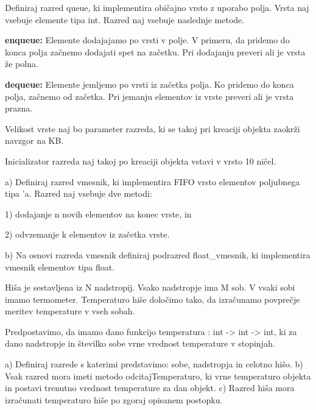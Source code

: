 \begin{ex}
  Definiraj razred queue, ki implementira obi\v cajno vrsto z uporabo
  polja. Vrsta naj vsebuje elemente tipa int. Razred naj vsebuje
  naslednje metode.

  \textbf{enqueue:} Elemente dodajajamo po vrsti v polje. V primeru,
  da pridemo do konca polja za\v cnemo dodajati spet na za\v
  cetku. Pri dodajanju preveri ali je vrsta \v ze polna.
                 
  \textbf{dequeue:} Elemente jemljemo po vrsti iz za\v cetka polja. Ko
  pridemo do konca polja, za\v cnemo od za\v cetka. Pri jemanju
  elementov iz vrste preveri ali je vrsta prazna.

  Velikost vrste naj bo parameter razreda, ki se takoj pri kreaciji
  objekta zaokr\v zi navzgor na KB.

  Inicializator razreda naj takoj po kreaciji objekta vstavi v vrsto
  10 ni\v cel.


\end{ex}
\begin{ex}
  a) Definiraj razred vmesnik, ki implementira FIFO vrsto elementov
  poljubnega tipa 'a. Razred naj vsebuje dve metodi:

  1) dodajanje n novih elementov na konec vrste, in
       
  2) odvzemanje k elementov iz za\v cetka vrste.

  b) Na osnovi razreda vmesnik definiraj podrazred float\_vmesnik, ki
  implementira vmesnik elementov tipa float.



\end{ex} 
\begin{ex}
Hi\v sa je sestavljena iz N nadstropij. Vsako nadstropje ima M sob. V vsaki sobi imamo termometer. Temperaturo hi\v se dolo\v cimo tako, da izra\v cunamo povpre\v cje meritev temperature v vseh sobah. 

Predpostavimo, da imamo dano funkcijo temperatura : int -> int -> int, ki za dano nadstropje in \v stevilko sobe vrne vrednost temperature v stopinjah. 

a) Definiraj razrede s katerimi predstavimo: sobe, nadstropja in celotno hi\v so.
b) Vsak razred mora imeti metodo odcitajTemperaturo, ki vrne temperaturo objekta in  postavi trenutno vrednost temperature za dan objekt.
c) Razred hi\v sa mora izra\v cunati temperaturo hi\v se po zgoraj opisanem postopku.


\end{ex} 
